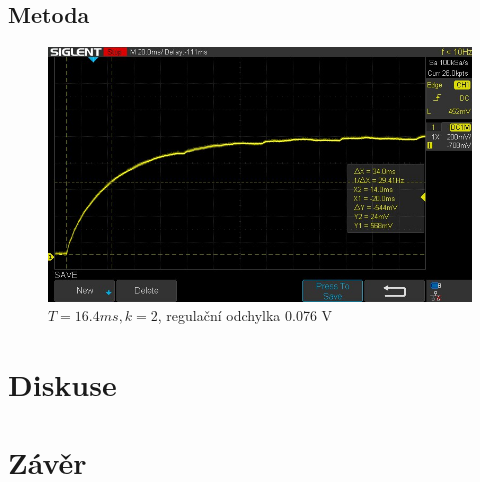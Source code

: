 	\subsection{Metoda }
	
		\begin{figure}[!hbt] 
			\centering
			\includegraphics[scale=0.6]{img/SDS00003.jpg} 
			\caption{$T=16.4\unit{ms}, k=2$, regulační odchylka 0.076 V} 
			\label{fig:pokus_omyl}
		\end{figure}
								
				
			
	\section{Diskuse}			

			
\section{Závěr}
	


